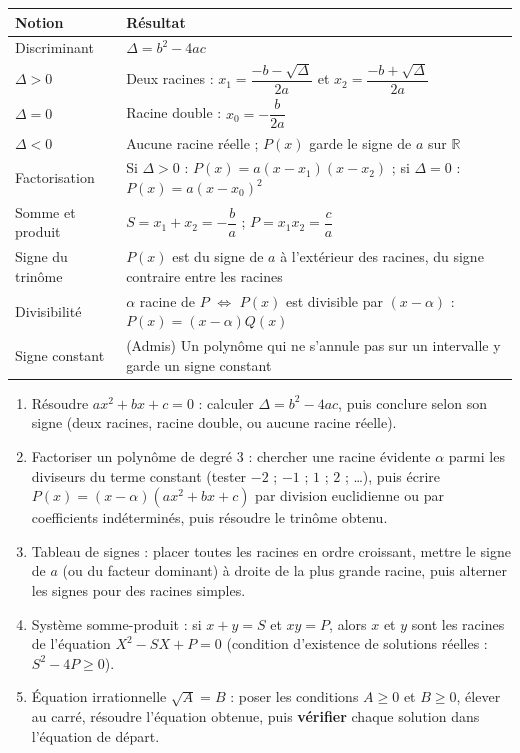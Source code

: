 \documentclass[11pt]{article}
\newcommand{\cle}[1]{{\popxbold\color{popdark}#1}}
\begin{document}
\begin{propriete}
\begin{center}
\begin{tabularx}{\linewidth}{|l|X|}
\hline
\rowcolor{popblueL} \textbf{Notion} & \textbf{Résultat} \\
\hline
Discriminant & $\Delta=b^2-4ac$ \\
\hline
$\Delta>0$ & Deux racines : $x_1=\dfrac{-b-\sqrt{\Delta}}{2a}$ et $x_2=\dfrac{-b+\sqrt{\Delta}}{2a}$ \\
\hline
$\Delta=0$ & Racine double : $x_0=-\dfrac{b}{2a}$ \\
\hline
$\Delta<0$ & Aucune racine réelle ; $P(x)$ garde le signe de $a$ sur $\mathbb{R}$ \\
\hline
Factorisation & Si $\Delta>0$ : $P(x)=a(x-x_1)(x-x_2)$ ; si $\Delta=0$ : $P(x)=a(x-x_0)^2$ \\
\hline
Somme et produit & $S=x_1+x_2=-\dfrac{b}{a}$ ; $P=x_1x_2=\dfrac{c}{a}$ \\
\hline
Signe du trinôme & $P(x)$ est du signe de $a$ à l'extérieur des racines, du signe contraire entre les racines \\
\hline
Divisibilité & $\alpha$ racine de $P$ $\iff$ $P(x)$ est divisible par $(x-\alpha)$ : $P(x)=(x-\alpha)Q(x)$ \\
\hline
Signe constant & (Admis) Un polynôme qui ne s'annule pas sur un intervalle y garde un signe constant \\
\hline
\end{tabularx}
\end{center}
\end{propriete}

\begin{methode}
\begin{enumerate}
\item \cle{Résoudre} $ax^2+bx+c=0$ : calculer $\Delta=b^2-4ac$, puis conclure selon son signe (deux racines, racine double, ou aucune racine réelle).
\item \cle{Factoriser un polynôme de degré 3} : chercher une racine évidente $\alpha$ parmi les diviseurs du terme constant (tester $-2$ ; $-1$ ; $1$ ; $2$ ; \dots), puis écrire $P(x)=(x-\alpha)(ax^2+bx+c)$ par division euclidienne ou par coefficients indéterminés, puis résoudre le trinôme obtenu.
\item \cle{Tableau de signes} : placer toutes les racines en ordre croissant, mettre le signe de $a$ (ou du facteur dominant) à droite de la plus grande racine, puis alterner les signes pour des racines simples.
\item \cle{Système somme-produit} : si $x+y=S$ et $xy=P$, alors $x$ et $y$ sont les racines de l'équation $X^2-SX+P=0$ (condition d'existence de solutions réelles : $S^2-4P\geq 0$).
\item \cle{Équation irrationnelle} $\sqrt{A}=B$ : poser les conditions $A\geq 0$ et $B\geq 0$, élever au carré, résoudre l'équation obtenue, puis \textbf{vérifier} chaque solution dans l'équation de départ.
\end{enumerate}
\end{methode}
\end{document}
